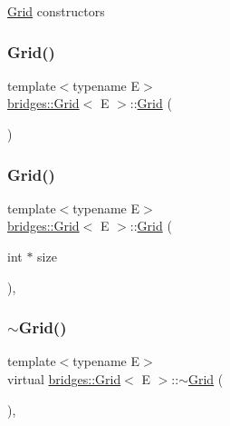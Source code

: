 \mbox{\hyperlink{classbridges_1_1_grid}{Grid}} constructors \mbox{\label{classbridges_1_1_grid_a711e05a933c2a11c9e2775c74e6cf80d}} 
\subsubsection{\texorpdfstring{Grid()}{Grid()}\hspace{0.1cm}{\footnotesize\ttfamily [2/4]}}
{\footnotesize\ttfamily template$<$typename E$>$ \\
\mbox{\hyperlink{classbridges_1_1_grid}{bridges\+::\+Grid}}$<$ E $>$\+::\mbox{\hyperlink{classbridges_1_1_grid}{Grid}} (\begin{DoxyParamCaption}{ }\end{DoxyParamCaption})\hspace{0.3cm}{\ttfamily [inline]}}

\mbox{\label{classbridges_1_1_grid_ad5c6c5e87eb40446ac794c5479937f87}} 
\subsubsection{\texorpdfstring{Grid()}{Grid()}\hspace{0.1cm}{\footnotesize\ttfamily [3/4]}}
{\footnotesize\ttfamily template$<$typename E$>$ \\
\mbox{\hyperlink{classbridges_1_1_grid}{bridges\+::\+Grid}}$<$ E $>$\+::\mbox{\hyperlink{classbridges_1_1_grid}{Grid}} (\begin{DoxyParamCaption}\item[{int $\ast$}]{size }\end{DoxyParamCaption})\hspace{0.3cm}{\ttfamily [inline]}, {\ttfamily [explicit]}}

\mbox{\label{classbridges_1_1_grid_a46cc94397ea38211349b10e3629b2590}} 
\subsubsection{\texorpdfstring{$\sim$\+Grid()}{~Grid()}}
{\footnotesize\ttfamily template$<$typename E$>$ \\
virtual \mbox{\hyperlink{classbridges_1_1_grid}{bridges\+::\+Grid}}$<$ E $>$\+::$\sim$\mbox{\hyperlink{classbridges_1_1_grid}{Grid}} (\begin{DoxyParamCaption}{ }\end{DoxyParamCaption})\hspace{0.3cm}{\ttfamily [inline]}, {\ttfamily [virtual]}}

